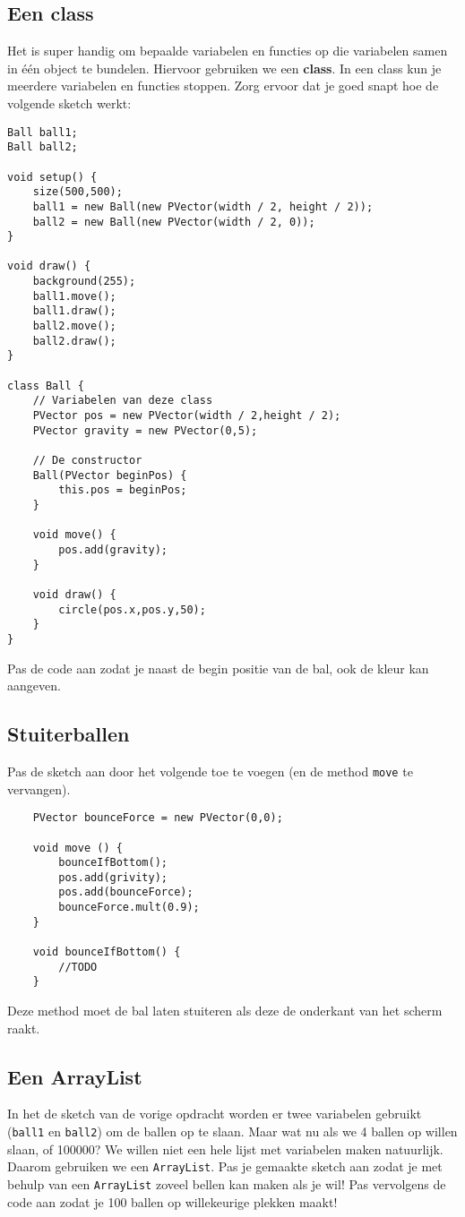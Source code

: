 \documentclass[../syllabus.tex]{subfiles}
\begin{document}
\subsection{Een class}
Het is super handig om bepaalde variabelen en functies op die variabelen samen in \'e\'en object te bundelen. Hiervoor gebruiken we een \textbf{class}. In een class kun je meerdere variabelen en functies stoppen. Zorg ervoor dat je goed snapt hoe de volgende sketch werkt:
\begin{lstlisting}
Ball ball1;
Ball ball2;

void setup() {
    size(500,500);
    ball1 = new Ball(new PVector(width / 2, height / 2));
    ball2 = new Ball(new PVector(width / 2, 0));
}

void draw() {
    background(255);
    ball1.move();
    ball1.draw();
    ball2.move();
    ball2.draw();
}

class Ball {
    // Variabelen van deze class
    PVector pos = new PVector(width / 2,height / 2);
    PVector gravity = new PVector(0,5);
    
    // De constructor
    Ball(PVector beginPos) {
        this.pos = beginPos;
    }
    
    void move() {
        pos.add(gravity);
    }
    
    void draw() {
        circle(pos.x,pos.y,50);
    }
}
\end{lstlisting}
Pas de code aan zodat je naast de begin positie van de bal, ook de kleur kan aangeven.

\newpage
\subsection{Stuiterballen}
Pas de sketch aan door het volgende toe te voegen (en de method \texttt{move} te vervangen).
\begin{lstlisting}
    PVector bounceForce = new PVector(0,0);

    void move () {
        bounceIfBottom();
        pos.add(grivity);
        pos.add(bounceForce);
        bounceForce.mult(0.9);
    }

    void bounceIfBottom() {
        //TODO
    }
\end{lstlisting}
Deze method moet de bal laten stuiteren als deze de onderkant van het scherm raakt. 

\subsection{Een ArrayList}
In het de sketch van de vorige opdracht worden er twee variabelen gebruikt (\texttt{ball1} en \texttt{ball2}) om de ballen op te slaan. Maar wat nu als we 4 ballen op willen slaan, of 100000? We willen niet een hele lijst met variabelen maken natuurlijk. Daarom gebruiken we een \texttt{ArrayList}. Pas je gemaakte sketch aan zodat je met behulp van een \texttt{ArrayList} zoveel bellen kan maken als je wil!
Pas vervolgens de code aan zodat je 100 ballen op willekeurige plekken maakt!
\end{document}
